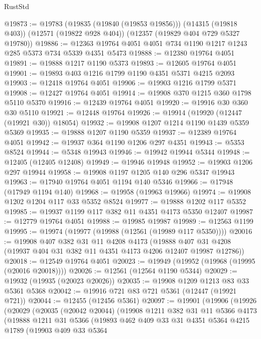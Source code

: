 \begin{lexlean}{RustStd}
\begin{coremodule}
@19873 := @19783
    (@19835 (@19840 (@19853 @19856)))
    (@14315 (@19818 @403))
    (@12571 (@19822 @928 @404))
    (@12357 (@19829 @404 @729 @5327 @19780))
@19886 := @12363 @19764 @4051 @4051 @734 @1190 @1217 @1243 @285 @5373 @734 @5339 @4351 @5473
@19888 := @12380 @19764 @4051
@19891 := @19888 @1217 @1190 @5373
@19893 := @12605 @19764 @4051
@19901 := @19893 @403 @1216 @1799 @1190 @4351 @5371 @4215 @2093
@19903 := @12418 @19764 @4051
@19906 := @19903 @1216 @1799 @5371
@19908 := @12427 @19764 @4051
@19914 := @19908 @370 @1215 @360 @1798 @5110 @5370
@19916 := @12439 @19764 @4051
@19920 := @19916 @30 @360 @30 @5110
@19921 := @12448 @19764
@19926 := @19914 (@19920 (@12447 (@19921 @30)) @18054)
@19932 := @19908 @1207 @1214 @1190 @1439 @5359 @5369
@19935 := @19888 @1207 @1190 @5359
@19937 := @12389 @19764 @4051
@19942 := @19937 @364 @1190 @1206 @297 @4351
@19943 := @5353 @8524
@19944 := @5348 @19943
@19946 := @19942 @19944 @5344
@19948 := @12405 (@12405 @12408)
@19949 := @19946 @19948
@19952 := @19903 @1206 @297 @19944
@19958 := @19908 @1197 @1205 @140 @296 @5347 @19943
@19963 := @17940 @19764 @4051 @1194 @140 @5346
@19966 := @17948 (@17949 @1194 @140)
@19968 := @19958 (@19963 @19966)
@19974 := @19908 @1202 @1204 @117 @33 @5352 @8524
@19977 := @19888 @1202 @117 @5352
@19985 := @19937 @1199 @117 @382 @11 @4351 @4173 @5350 @12407
@19987 := @12779 @19764 @4051
@19988 := @19985 @19987
@19989 := @12563 @1199
@19995 := @19974 (@19977 (@19988 (@12561 (@19989 @117 @5350))))
@20016 := @19908
    @407
    @382
    @31
    @11
    @4208
    @4173
    (@19888 @407 @31 @4208 (@19937 @404 @31 @382 @11 @4351 @4173 @4206 @12407 @19987 @12786))
@20018 := @12549 @19764 @4051
@20023 := @19949 (@19952 (@19968 (@19995 (@20016 @20018))))
@20026 := @12561 (@12564 @1190 @5344)
@20029 := @19932 (@19935 (@20023 @20026))
@20035 := @19908 @1209 @1213 @83 @33 @5361 @5368
@20042 := @19916 @721 @83 @721 @5361 (@12447 (@19921 @721))
@20044 := @12455 (@12456 @5361)
@20097 := @19901
    (@19906
      (@19926
        (@20029
          (@20035
            (@20042 @20044)
            (@19908
              @1211
              @382
              @31
              @11
              @5366
              @4173
              (@19888
                @1211
                @31
                @5366
                (@19893
                  @462
                  @409
                  @33
                  @31
                  @4351
                  @5364
                  @4215
                  @1789
                  (@19903
                    @409
                    @33
                    @5364

\end{coremodule}
\end{lexlean}
